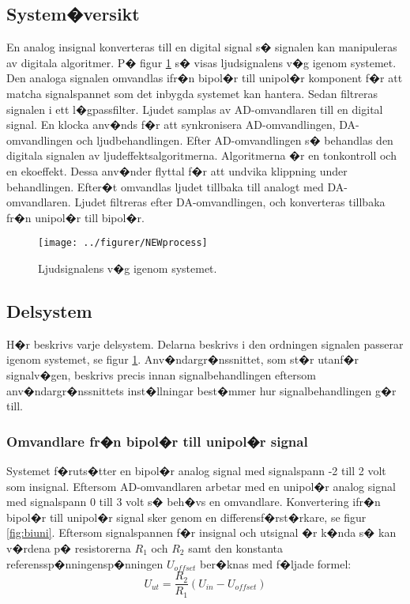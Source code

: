 \documentclass[a4paper]{article}
\begin{document}
\subsection{System�versikt}
\label{sec:systemoversikt}
En analog insignal konverteras till en digital signal s� signalen kan manipuleras av digitala algoritmer. P� figur \ref{fig:process} s� visas ljudsignalens v�g igenom systemet. Den analoga signalen omvandlas ifr�n bipol�r till unipol�r komponent f�r att matcha signalspannet som det inbygda systemet kan hantera. Sedan filtreras signalen i ett l�gpassfilter. Ljudet samplas av AD-omvandlaren till en digital signal. En klocka anv�nds f�r att synkronisera AD-omvandlingen, DA-omvandlingen och ljudbehandlingen. Efter AD-omvandlingen s� behandlas den digitala signalen av ljudeffektsalgoritmerna. Algoritmerna �r en tonkontroll och en ekoeffekt. Dessa anv�nder flyttal f�r att undvika klippning under behandlingen. Efter�t omvandlas ljudet tillbaka till analogt med DA-omvandlaren. Ljudet filtreras efter DA-omvandlingen, och konverteras tillbaka fr�n unipol�r till bipol�r.

\begin{figure}[h!]
  \centering
  \texttt{[image: ../figurer/NEWprocess]}
  \caption{Ljudsignalens v�g igenom systemet.}
  \label{fig:process}
\end{figure}

\newpage
\subsection{Delsystem}
\label{sec:Delsystem}
H�r beskrivs varje delsystem. Delarna beskrivs i den ordningen signalen passerar igenom systemet, se figur \ref{fig:process}. Anv�ndargr�nssnittet, som st�r utanf�r signalv�gen, beskrivs precis innan signalbehandlingen eftersom anv�ndargr�nssnittets inst�llningar best�mmer hur signalbehandlingen g�r till.

\subsubsection{Omvandlare fr�n bipol�r till unipol�r signal}
Systemet f�ruts�tter en bipol�r analog signal med signalspann -2 till 2 volt som insignal. Eftersom AD-omvandlaren arbetar med en unipol�r analog signal med signalspann 0 till 3 volt s� beh�vs en omvandlare. Konvertering ifr�n bipol�r till unipol�r signal sker genom en differensf�rst�rkare, se figur \ref{fig:biuni}. Eftersom signalspannen f�r insignal och utsignal �r k�nda s� kan v�rdena p� resistorerna $R_1$ och $R_2$ samt den konstanta referenssp�nningensp�nningen $U_{offset}$ ber�knas med f�ljade formel:
\newline
\[U_{ut} = \frac{R_2}{R_1}(U_{in} - U_{offset})\]
\newline
\end{document}
